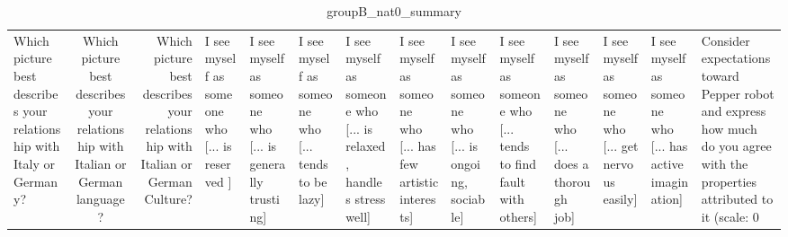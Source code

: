 \begin{table}
\caption{groupB_nat0_summary}
\label{tab:groupB_nat0_summary}
\begin{tabular}{lcr}
\toprule
Which picture best describes your relationship with Italy or Germany? & Which picture best describes your relationship with Italian or German language? & Which picture best describes your relationship with Italian or German Culture? & I see myself as someone who  [... is reserved ] & I see myself as someone who  [... is generally trusting] & I see myself as someone who  [... tends to be lazy] & I see myself as someone who  [... is relaxed, handles stress well] & I see myself as someone who  [... has few artistic interests] & I see myself as someone who  [... is ongoing, sociable] & I see myself as someone who  [... tends to find fault with others] & I see myself as someone who  [... does a thorough job] & I see myself as someone who  [... get nervous easily] & I see myself as someone who  [... has active imagination] & Consider expectations toward Pepper robot and express how much do you agree with the properties attributed to it (scale: 0%
\end{tabular}
\end{table}
